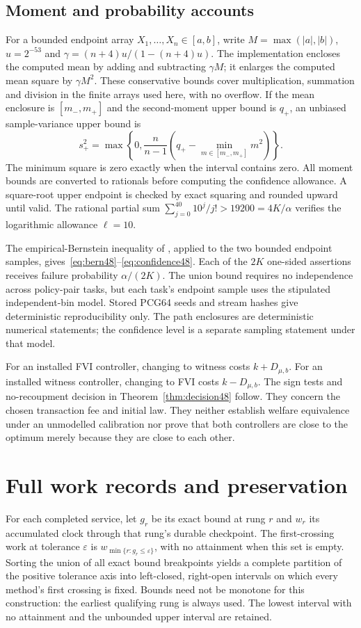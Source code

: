 \subsection{Moment and probability accounts}
For a bounded endpoint array $X_1,\ldots,X_n\in[a,b]$, write $M=\max(|a|,|b|)$, $u=2^{-53}$ and $\gamma=(n+4)u/(1-(n+4)u)$. The implementation encloses the computed mean by adding and subtracting $\gamma M$; it enlarges the computed mean square by $\gamma M^2$. These conservative bounds cover multiplication, summation and division in the finite arrays used here, with no overflow. If the mean enclosure is $[m_-,m_+]$ and the second-moment upper bound is $q_+$, an unbiased sample-variance upper bound is
\[
 s_+^2=\max\left\{0,\frac n{n-1}
 \left(q_+-\min_{m\in[m_-,m_+]}m^2\right)\right\}.
\]
The minimum square is zero exactly when the interval contains zero. All moment bounds are converted to rationals before computing the confidence allowance. A square-root upper endpoint is checked by exact squaring and rounded upward until valid. The rational partial sum $\sum_{j=0}^{40}10^j/j!>19200=4K/\alpha$ verifies the logarithmic allowance $\ell=10$.

The empirical-Bernstein inequality of \citet{maurer2009}, applied to the two bounded endpoint samples, gives~\eqref{eq:bern48}--\eqref{eq:confidence48}. Each of the $2K$ one-sided assertions receives failure probability $\alpha/(2K)$. The union bound requires no independence across policy-pair tasks, but each task's endpoint sample uses the stipulated independent-bin model. Stored PCG64 seeds and stream hashes give deterministic reproducibility only. The path enclosures are deterministic numerical statements; the confidence level is a separate sampling statement under that model.

For an installed FVI controller, changing to witness costs $k+D_{\mu,b}$. For an installed witness controller, changing to FVI costs $k-D_{\mu,b}$. The sign tests and no-recoupment decision in Theorem~\ref{thm:decision48} follow. They concern the chosen transaction fee and initial law. They neither establish welfare equivalence under an unmodelled calibration nor prove that both controllers are close to the optimum merely because they are close to each other.

\section{Full work records and preservation}\label{supp:work48}
For each completed service, let $g_r$ be its exact bound at rung $r$ and $w_r$ its accumulated clock through that rung's durable checkpoint. The first-crossing work at tolerance $\varepsilon$ is $w_{\min\{r:g_r\le\varepsilon\}}$, with no attainment when this set is empty. Sorting the union of all exact bound breakpoints yields a complete partition of the positive tolerance axis into left-closed, right-open intervals on which every method's first crossing is fixed. Bounds need not be monotone for this construction: the earliest qualifying rung is always used. The lowest interval with no attainment and the unbounded upper interval are retained.

